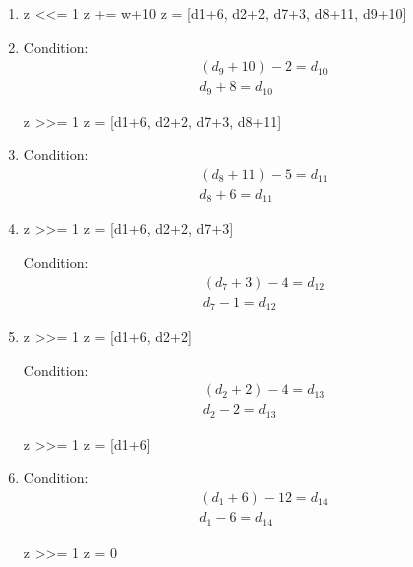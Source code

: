 \documentclass{article}
\begin{document}
\begin{enumerate}
\item{}
\begin{snippet}[py]
z <<= 1
z += w+10
z = [d1+6, d2+2, d7+3, d8+11, d9+10]
\end{snippet}

\item{}

Condition: 
\begin{align*}
(d_9 + 10) - 2 = d_{10} \\
d_9 + 8 = d_{10}
\end{align*}
\begin{snippet}[py]
z >>= 1
z = [d1+6, d2+2, d7+3, d8+11]
\end{snippet}

\item{}

Condition: 
\begin{align*}
(d_8 + 11) - 5 = d_{11} \\
d_8 + 6 = d_{11}
\end{align*}

\item{}
\begin{snippet}[py]
z >>= 1
z = [d1+6, d2+2, d7+3]
\end{snippet}

Condition: 
\begin{align*}
(d_7 + 3) - 4 = d_{12} \\
d_7 - 1 = d_{12}
\end{align*}

\item{}
\begin{snippet}[py]
z >>= 1
z = [d1+6, d2+2]
\end{snippet}

Condition: 
\begin{align*}
(d_2 + 2) - 4 = d_{13} \\
d_2 - 2 = d_{13}
\end{align*}
\begin{snippet}[py]
z >>= 1
z = [d1+6]
\end{snippet}

\item{}

Condition: 
\begin{align*}
(d_1 + 6) - 12 = d_{14} \\
d_1 - 6 = d_{14}
\end{align*}
\begin{snippet}[py]
z >>= 1
z = 0
\end{snippet}
\end{enumerate}
\end{document}
